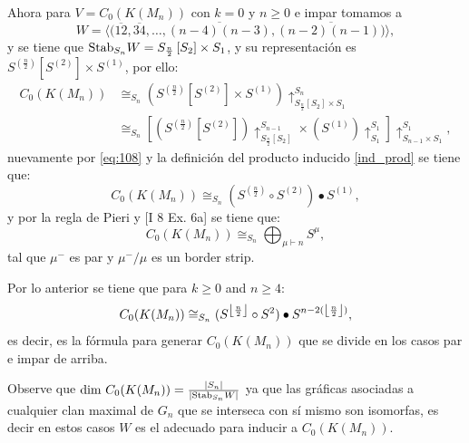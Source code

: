 \documentclass[12pt]{book}
\DeclarePairedDelimiter\floor{\lfloor}{\rfloor}
\theoremstyle{definition}
\newcounter{in}
\newcounter{ini}
\begin{document}
Ahora para $V = C_{0}(K(M_n))$ con $k=0$ y $n \geq 0$ e impar tomamos a
  $$W = \langle (\overline{12},\overline{34},\ldots,\overline{(n-4)(n-3)}, \overline{(n-2)(n-1))} \rangle,$$
y se tiene que $\textup{Stab}_{S_{n}} W = S_{\frac{n}{2}} \left [ S_{2} \right ] \times S_{1}$, y su representación es $S^{(\frac{n}{2})} \left [ S^{(2)} \right ] \times S^{(1)}$, por ello:
\begin{equation}
\begin{aligned}
C_{0}(K(M_{n})) & \cong_{S_{n}} (S^{(\frac{n}{2})} \left [ S^{(2)} \right ] \times S^{(1)})\uparrow_{S_{\frac{n}{2}} \left [ S_{2} \right ] \times S_{1}}^{S_{n}} \\
& \cong_{S_{n}} \left [ (S^{(\frac{n}{2})} \left [ S^{(2)} \right ])\uparrow_{S_{\frac{n}{2}} \left [ S_{2} \right ]}^{S_{n-1}} \times (S^{(1)})\uparrow_{S_{1}}^{S_{1}} \right ] \uparrow_{S_{n-1} \times S_{1}}^{S_{1}},
\end{aligned}
\end{equation} 
nuevamente por \ref{eq:108} y la definición del producto inducido \ref{ind_prod} se tiene que:
\begin{equation}
C_{0}(K(M_{n})) \cong_{S_{n}} (S^{(\frac{n}{2})} \circ S^{(2)} ) \bullet S^{(1)},
\end{equation} 
y por la regla de Pieri \cite{wachs2006poset} y \cite{macdonald1998symmetric} [I 8 Ex. 6a] se tiene que:
\begin{equation}
  \label{eq:112}
   C_{0}(K(M_n)) \cong_{S_{n}} \bigoplus_{\mu \vdash n} S^{\mu},
\end{equation}
tal que $\mu^{-}$ es par y $\mu^{-} / \mu$ es un border strip.

Por lo anterior se tiene que para $k \geq 0$ and $n \geq 4$:
\begin{equation}
  \label{eq:113}
  C_{0}(K(M_n)) \cong_{S_{n}} (S^{\floor*{\frac{n}{2}}} \circ S^{2}) \bullet S^{n-2(\floor*{\frac{n}{2}})},
\end{equation}
es decir, es la fórmula para generar $C_{0}(K(M_n))$ que se divide en los casos par e impar de arriba.

Observe que $\textup{dim } C_{0}(K(M_n)) = \frac{|S_{n}|}{|\textup{Stab}_{S_{n}} W|}$ ya que las gráficas asociadas a cualquier clan maximal de $G_{n}$ que se interseca con sí mismo son isomorfas, es decir en estos casos $W$ es el adecuado para inducir a $C_{0}(K(M_n))$. 
\end{document}
